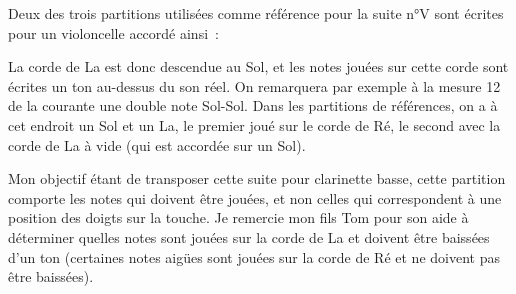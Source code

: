 \documentclass[a4paper,twoside]{article}
\begin{document}
Deux des trois partitions utilisées comme référence pour la suite n°V sont écrites 
pour un violoncelle accordé ainsi~:

\smallskip
La corde de La est donc descendue au Sol, et les notes jouées sur cette corde sont 
écrites un ton au-dessus du son réel. On remarquera par exemple à la mesure 12 de 
la courante une double note Sol-Sol. Dans les partitions de références, on a à cet 
endroit un Sol et un La, le premier joué sur le corde de Ré, le second avec la corde
de La à vide (qui est accordée sur un Sol).

\medskip

Mon objectif étant de transposer cette suite pour clarinette basse, cette partition 
comporte les notes qui doivent être jouées, et non celles qui correspondent à une 
position des doigts sur la touche. Je remercie mon fils Tom pour son aide à déterminer 
quelles notes sont jouées sur la corde de La et doivent être baissées d'un ton 
(certaines notes aigües sont jouées sur la corde de Ré et ne doivent pas être baissées).
\end{document}
